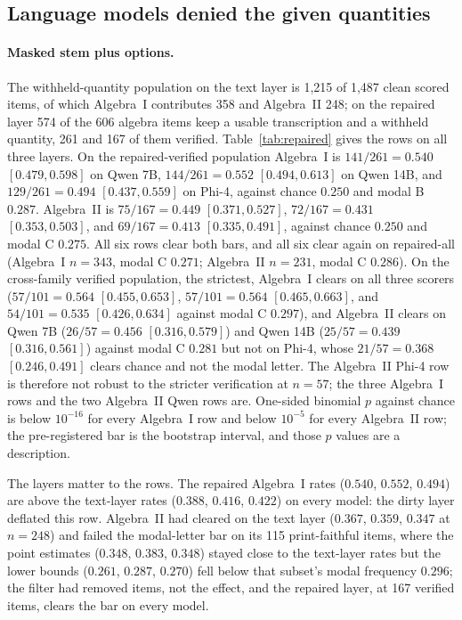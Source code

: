 \subsection{Language models denied the given quantities}
\label{sec:partial-input}

\paragraph{Masked stem plus options.}
The withheld-quantity population on the text layer is 1{,}215 of 1{,}487 clean scored items, of which Algebra~I contributes 358 and Algebra~II 248; on the repaired layer 574 of the 606 algebra items keep a usable transcription and a withheld quantity, 261 and 167 of them verified. Table~\ref{tab:repaired} gives the rows on all three layers. On the repaired-verified population Algebra~I is $141/261=0.540$ $[0.479, 0.598]$ on Qwen 7B, $144/261=0.552$ $[0.494, 0.613]$ on Qwen 14B, and $129/261=0.494$ $[0.437, 0.559]$ on Phi-4, against chance $0.250$ and modal B $0.287$. Algebra~II is $75/167=0.449$ $[0.371, 0.527]$, $72/167=0.431$ $[0.353, 0.503]$, and $69/167=0.413$ $[0.335, 0.491]$, against chance $0.250$ and modal C $0.275$. All six rows clear both bars, and all six clear again on repaired-all (Algebra~I $n=343$, modal C $0.271$; Algebra~II $n=231$, modal C $0.286$). On the cross-family verified population, the strictest, Algebra~I clears on all three scorers ($57/101=0.564$ $[0.455, 0.653]$, $57/101=0.564$ $[0.465, 0.663]$, and $54/101=0.535$ $[0.426, 0.634]$ against modal C $0.297$), and Algebra~II clears on Qwen 7B ($26/57=0.456$ $[0.316, 0.579]$) and Qwen 14B ($25/57=0.439$ $[0.316, 0.561]$) against modal C $0.281$ but not on Phi-4, whose $21/57=0.368$ $[0.246, 0.491]$ clears chance and not the modal letter. The Algebra~II Phi-4 row is therefore not robust to the stricter verification at $n=57$; the three Algebra~I rows and the two Algebra~II Qwen rows are. One-sided binomial $p$ against chance is below $10^{-16}$ for every Algebra~I row and below $10^{-5}$ for every Algebra~II row; the pre-registered bar is the bootstrap interval, and those $p$ values are a description.

The layers matter to the rows. The repaired Algebra~I rates ($0.540$, $0.552$, $0.494$) are above the text-layer rates ($0.388$, $0.416$, $0.422$) on every model: the dirty layer deflated this row. Algebra~II had cleared on the text layer ($0.367$, $0.359$, $0.347$ at $n=248$) and failed the modal-letter bar on its 115 print-faithful items, where the point estimates ($0.348$, $0.383$, $0.348$) stayed close to the text-layer rates but the lower bounds ($0.261$, $0.287$, $0.270$) fell below that subset's modal frequency $0.296$; the filter had removed items, not the effect, and the repaired layer, at 167 verified items, clears the bar on every model.

